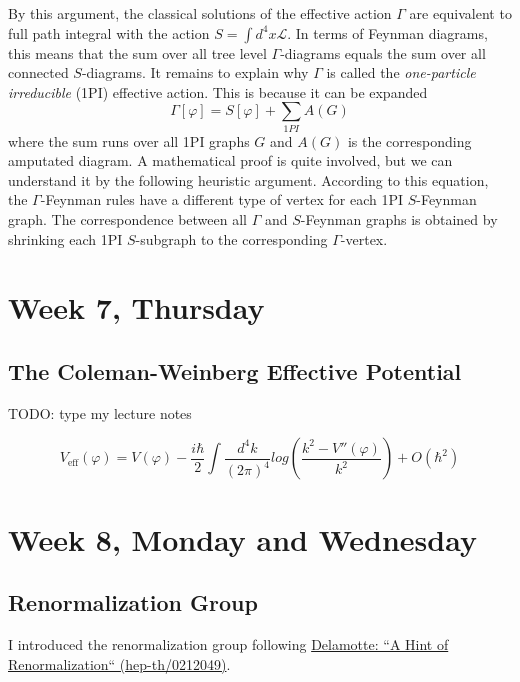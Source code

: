 \documentclass[12pt]{article}
\begin{document}
By this argument, the classical solutions of the effective action
$\Gamma$ are equivalent to full path integral with the action $S=\int
d^4x \mathcal{L}$. In terms of Feynman diagrams, this means that the
sum over all tree level $\Gamma$-diagrams equals the sum over all
connected $S$-diagrams. It remains to explain why $\Gamma$ is called
the \emph{one-particle irreducible} (1PI) effective action. This is
because it can be expanded
\begin{equation}
  \Gamma[\varphi] = S[\varphi] + \sum_{1PI} A(G)
\end{equation}
where the sum runs over all 1PI graphs $G$ and $A(G)$ is the
corresponding amputated diagram. A mathematical proof is quite
involved, but we can understand it by the following heuristic
argument. According to this equation, the $\Gamma$-Feynman rules have
a different type of vertex for each 1PI $S$-Feynman graph. The
correspondence between all $\Gamma$ and $S$-Feynman graphs is obtained
by shrinking each 1PI $S$-subgraph to the corresponding
$\Gamma$-vertex.



\section{Week 7, Thursday}

\subsection{The Coleman-Weinberg Effective Potential}

TODO: type my lecture notes

\begin{equation}
  V_\text{eff}(\varphi) = V(\varphi) 
  - \frac{i\hbar}{2}
  \int \frac{d^4k}{(2\pi)^4}
  log \left(
    \frac{k^2 - V''(\varphi)}{k^2}
  \right)
  + O(\hbar^2)
\end{equation}




\section{Week 8, Monday and Wednesday} 

\subsection{Renormalization Group}

I introduced the renormalization group following
\href{http://arxiv.org/abs/hep-th/0212049}{Delamotte: ``A Hint of
  Renormalization`` (hep-th/0212049)}.
\end{document}
